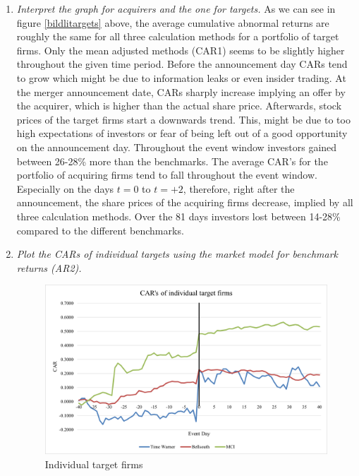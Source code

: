\documentclass[11pt,a4paper,openany,oneside]{article}%
\begin{document}
\begin{enumerate}[label=\alph*),leftmargin=*]
\item \textit{Interpret the graph for acquirers and the one for targets.} \newline
As we can see in figure \ref{bildlitargets} above, the average cumulative abnormal returns are roughly the same for all three calculation methods for a portfolio of target firms. Only the mean adjusted methods (CAR1) seems to be slightly higher throughout the given time period. Before the announcement day CARs tend to grow which might be due to information leaks or even insider trading. At the merger announcement date, CARs sharply increase implying an offer by the acquirer, which is higher than the actual share price. Afterwards, stock prices of the target firms start a downwards trend. This, might be due to too high expectations of investors or fear of being left out of a good opportunity on the announcement day. Throughout the event window investors gained between 26-28\% more than the benchmarks. \newline
The average CAR’s for the portfolio of acquiring firms tend to fall throughout the event window. Especially on the days $t=0$ to $t=+2$, therefore, right after the announcement, the share prices of the acquiring firms decrease, implied by all three calculation methods. Over the 81 days investors lost between 14-28\% compared to the different benchmarks. \newpage

\item \textit{Plot the CARs of individual targets using the market model for benchmark returns (AR2).} \newline
\begin{figure}[H]
    \centering
    \includegraphics[scale=0.75]{Bild3.png}
    \caption{Individual target firms}
    \label{Individualtargetfirm3}
\end{figure}


\end{enumerate}
\end{document}
